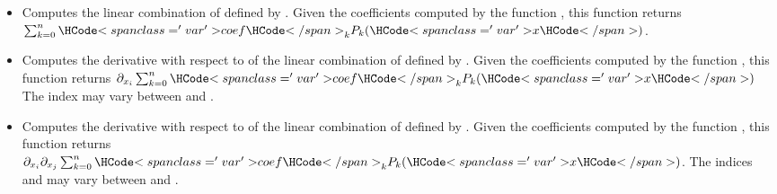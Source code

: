 \begin{itemize}
\item {}
  \sshortdescribe Computes the linear combination of  defined by
  . Given the coefficients computed by the function
  , this function returns $\sum_{k=0}^n
  \var{coef}_k  P_k(\var{x})$.

\item {}
  \sshortdescribe Computes the derivative with respect to  of the
  linear combination of  defined by . Given the
  coefficients computed by the function , this function
  returns $\partial_{x_i} \sum_{k=0}^n \var{coef}_k  P_k(\var{x})$ The index
   may vary between  and .


\item {}
  \sshortdescribe Computes the derivative with respect to  of the
  linear combination of  defined by . Given the
  coefficients computed by the function , this function
  returns $\partial_{x_i} \partial_{x_j} \sum_{k=0}^n \var{coef}_k
  P_k(\var{x})$.  The indices  and  may vary between  and
  .


\end{itemize}
